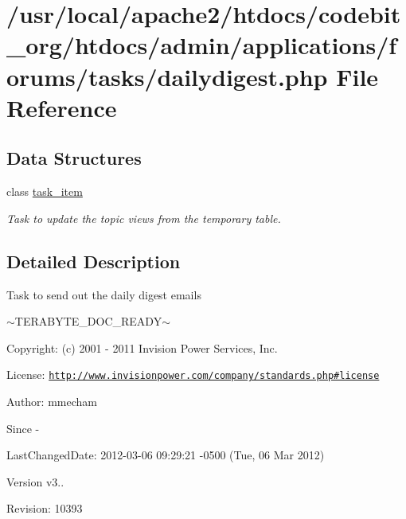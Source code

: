 \hypertarget{dailydigest_8php}{\section{/usr/local/apache2/htdocs/codebit\-\_\-org/htdocs/admin/applications/forums/tasks/dailydigest.php File Reference}
\label{dailydigest_8php}
}
\subsection*{Data Structures}
\begin{DoxyCompactItemize}
\item 
class \hyperlink{classtask__item}{task\-\_\-item}
\begin{DoxyCompactList}\small\item\em Task to update the topic views from the temporary table. \end{DoxyCompactList}\end{DoxyCompactItemize}


\subsection{Detailed Description}
\begin{DoxyVerb}  Task to send out the daily digest emails
\end{DoxyVerb}
 $\sim$\-T\-E\-R\-A\-B\-Y\-T\-E\-\_\-\-D\-O\-C\-\_\-\-R\-E\-A\-D\-Y$\sim$ \begin{DoxyParagraph}{Copyright\-:}
(c) 2001 -\/ 2011 Invision Power Services, Inc.
\end{DoxyParagraph}
\begin{DoxyParagraph}{License\-:}
\href{http://www.invisionpower.com/company/standards.php#license}{\tt http\-://www.\-invisionpower.\-com/company/standards.\-php\#license}
\end{DoxyParagraph}
\begin{DoxyParagraph}{Author\-:}
mmecham 
\end{DoxyParagraph}
\begin{DoxySince}{Since}
-\/ 
\end{DoxySince}
\begin{DoxyParagraph}{Last\-Changed\-Date\-:}
2012-\/03-\/06 09\-:29\-:21 -\/0500 (Tue, 06 Mar 2012) 
\end{DoxyParagraph}
\begin{DoxyVersion}{Version}
v3.. 
\end{DoxyVersion}
\begin{DoxyParagraph}{Revision\-:}
10393 
\end{DoxyParagraph}
